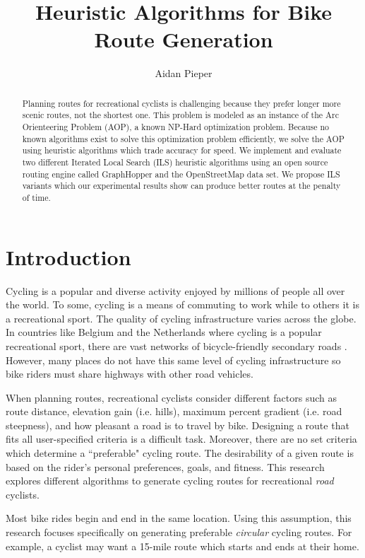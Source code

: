 \documentclass[11pt]{article}
\begin{document}
\title{Heuristic Algorithms for Bike Route Generation}
\author{Aidan Pieper}
\maketitle

\begin{abstract}
Planning routes for recreational cyclists is challenging because they prefer longer more scenic routes, not the shortest one. This problem is modeled as an instance of the Arc Orienteering Problem (AOP), a known NP-Hard optimization problem. Because no known algorithms exist to solve this optimization problem efficiently, we solve the AOP using  heuristic algorithms which trade accuracy for speed. We implement and evaluate two different Iterated Local Search (ILS) heuristic algorithms using an open source routing engine called GraphHopper and the OpenStreetMap data set. We propose ILS variants which our experimental results show can produce better routes at the penalty of time. 

\end{abstract}

\section{Introduction}
Cycling is a popular and diverse activity enjoyed by millions of people all over the world. To some, cycling is a means of commuting to work while to others it is a recreational sport.  The quality of cycling infrastructure varies across the globe. In countries like Belgium and the Netherlands where cycling is a popular recreational sport, there are vast networks of bicycle-friendly secondary roads \cite{souffriau2011planning}. However, many places do not have this same level of cycling infrastructure so bike riders must share highways with other road vehicles.


When planning routes, recreational cyclists consider different factors such as route distance, elevation gain (i.e. hills), maximum percent gradient (i.e. road steepness), and how pleasant a road is to travel by bike. Designing a route that fits all user-specified criteria is a difficult task.  Moreover, there are no set criteria which determine a ``preferable" cycling route. The desirability of a given route is based on the rider's personal preferences, goals, and fitness. This research explores different algorithms to generate cycling routes for recreational \emph{road} cyclists.


Most bike rides begin and end in the same location. Using this assumption, this research focuses specifically on generating preferable \emph{circular} cycling routes. For example, a cyclist may want a 15-mile route which starts and ends at their home.
    
\end{document}
